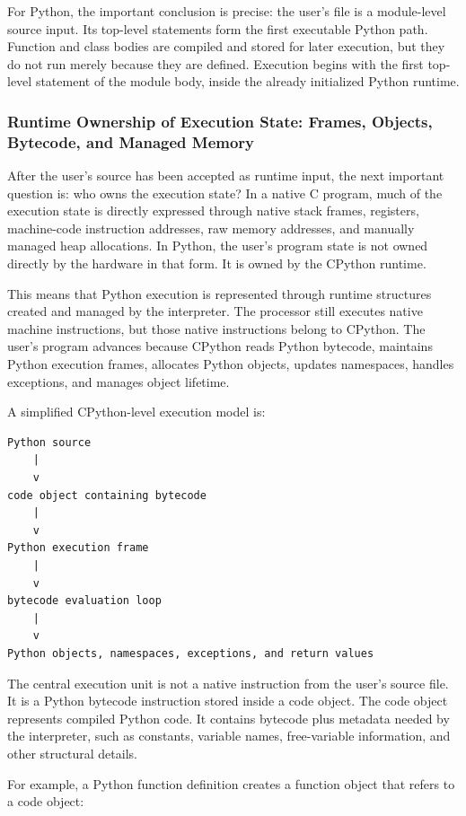 \documentclass[a4paper,twoside]{report}
\begin{document}
For Python, the important conclusion is precise: the user's file is a module-level source input. Its top-level statements form the first executable Python path. Function and class bodies are compiled and stored for later execution, but they do not run merely because they are defined. Execution begins with the first top-level statement of the module body, inside the already initialized Python runtime.



\subsubsection{Runtime Ownership of Execution State: Frames, Objects, Bytecode, and Managed Memory}

After the user's source has been accepted as runtime input, the next important question is: who owns the execution state? In a native C program, much of the execution state is directly expressed through native stack frames, registers, machine-code instruction addresses, raw memory addresses, and manually managed heap allocations. In Python, the user's program state is not owned directly by the hardware in that form. It is owned by the CPython runtime.

This means that Python execution is represented through runtime structures created and managed by the interpreter. The processor still executes native machine instructions, but those native instructions belong to CPython. The user's program advances because CPython reads Python bytecode, maintains Python execution frames, allocates Python objects, updates namespaces, handles exceptions, and manages object lifetime.

A simplified CPython-level execution model is:

\begin{verbatim}
Python source
    |
    v
code object containing bytecode
    |
    v
Python execution frame
    |
    v
bytecode evaluation loop
    |
    v
Python objects, namespaces, exceptions, and return values
\end{verbatim}

The central execution unit is not a native instruction from the user's source file. It is a Python bytecode instruction stored inside a code object. The code object represents compiled Python code. It contains bytecode plus metadata needed by the interpreter, such as constants, variable names, free-variable information, and other structural details.

For example, a Python function definition creates a function object that refers to a code object:
\end{document}
